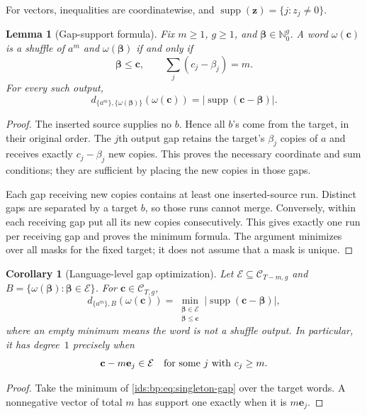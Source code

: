 \documentclass[11pt,letterpaper]{article}
\newtheorem{lemma}[theorem]{Lemma}
\newtheorem{corollary}[theorem]{Corollary}
\theoremstyle{definition}\newtheorem{definition}[theorem]{Definition}
\theoremstyle{remark}\newtheorem{remark}[theorem]{Remark}
\theoremstyle{definition}\newtheorem{question}[theorem]{Question}
\newcommand{\Nzero}{\mathbb N_0}
\DeclareMathOperator{\supp}{supp}
\newcommand{\bpgap}[1]{\omega(#1)}
\newcommand{\bpC}[2]{\mathcal C_{#1,#2}}
\newcommand{\bpE}{\mathcal E}
\begin{document}
For vectors, inequalities are coordinatewise, and
$\supp(\mathbf z)=\{j:z_j\ne0\}$.

\begin{lemma}[Gap-support formula]
\label{ids:bp:lem:gap}
Fix $m\geq1$, $g\geq1$, and $\boldsymbol\beta\in\Nzero^g$. A word
$\bpgap{\mathbf c}$ is a shuffle of $a^m$ and $\bpgap{\boldsymbol\beta}$ if and
only if
\[
 \boldsymbol\beta\leq\mathbf c,\qquad
 \sum_j(c_j-\beta_j)=m.
\]
For every such output,
\begin{equation}
 d_{\{a^m\},\{\bpgap{\boldsymbol\beta}\}}(\bpgap{\mathbf c})
   =|\supp(\mathbf c-\boldsymbol\beta)|.
 \label{ids:bp:eq:singleton-gap}
\end{equation}
\end{lemma}
\begin{proof}
The inserted source supplies no $b$. Hence all $b$'s come from the target,
in their original order. The $j$th output gap retains the target's $\beta_j$
copies of $a$ and receives exactly $c_j-\beta_j$ new copies. This proves the
necessary coordinate and sum conditions; they are sufficient by placing the
new copies in those gaps.

Each gap receiving new copies contains at least one inserted-source run.
Distinct gaps are separated by a target $b$, so those runs cannot merge.
Conversely, within each receiving gap put all its new copies consecutively.
This gives exactly one run per receiving gap and proves the minimum formula.
The argument minimizes over all masks for the fixed target; it does not
assume that a mask is unique.
\end{proof}

\begin{corollary}[Language-level gap optimization]
\label{ids:bp:cor:gap-language}
Let $\bpE\subseteq\bpC{T-m}{g}$ and
$B=\{\bpgap{\boldsymbol\beta}:\boldsymbol\beta\in \bpE\}$. For
$\mathbf c\in\bpC{T}{g}$,
\begin{equation}
 d_{\{a^m\},B}(\bpgap{\mathbf c})
 =\min_{\substack{\boldsymbol\beta\in \bpE\\\boldsymbol\beta\leq\mathbf c}}
       |\supp(\mathbf c-\boldsymbol\beta)|,
 \label{ids:bp:eq:language-gap}
\end{equation}
where an empty minimum means the word is not a shuffle output. In particular,
it has degree~$1$ precisely when
\begin{equation}
 \mathbf c-m\mathbf e_j\in \bpE
 \quad\hbox{for some $j$ with $c_j\geq m$}.
 \label{ids:bp:eq:one-run}
\end{equation}
\end{corollary}
\begin{proof}
Take the minimum of \eqref{ids:bp:eq:singleton-gap} over the target words. A
nonnegative vector of total $m$ has support one exactly when it is
$m\mathbf e_j$.
\end{proof}
\end{document}
